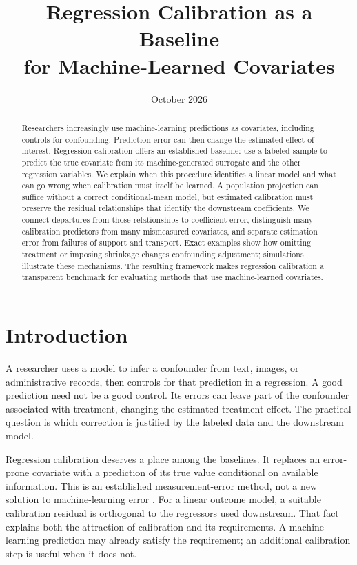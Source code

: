 \documentclass[11pt]{article}
\title{Regression Calibration as a Baseline\\for Machine-Learned Covariates}
\author{}
\date{October 2026}
\begin{document}
\maketitle
\begin{abstract}
Researchers increasingly use machine-learning predictions as covariates, including controls for confounding. Prediction error can then change the estimated effect of interest. Regression calibration offers an established baseline: use a labeled sample to predict the true covariate from its machine-generated surrogate and the other regression variables. We explain when this procedure identifies a linear model and what can go wrong when calibration must itself be learned. A population projection can suffice without a correct conditional-mean model, but estimated calibration must preserve the residual relationships that identify the downstream coefficients. We connect departures from those relationships to coefficient error, distinguish many calibration predictors from many mismeasured covariates, and separate estimation error from failures of support and transport. Exact examples show how omitting treatment or imposing shrinkage changes confounding adjustment; simulations illustrate these mechanisms. The resulting framework makes regression calibration a transparent benchmark for evaluating methods that use machine-learned covariates.
\end{abstract}

\section{Introduction}
A researcher uses a model to infer a confounder from text, images, or administrative records, then controls for that prediction in a regression. A good prediction need not be a good control. Its errors can leave part of the confounder associated with treatment, changing the estimated treatment effect. The practical question is which correction is justified by the labeled data and the downstream model.

Regression calibration deserves a place among the baselines. It replaces an error-prone covariate with a prediction of its true value conditional on available information. This is an established measurement-error method, not a new solution to machine-learning error \citep{carroll1990,boe2023}. For a linear outcome model, a suitable calibration residual is orthogonal to the regressors used downstream. That fact explains both the attraction of calibration and its requirements. A machine-learning prediction may already satisfy the requirement; an additional calibration step is useful when it does not.
\end{document}
